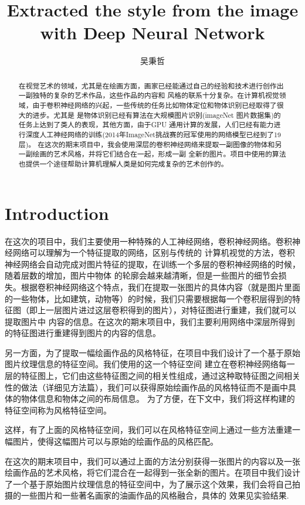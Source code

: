 \documentclass[10pt,a4paper]{ctexart}
\author{吴秉哲}
\title{Extracted the style from the image\\with Deep Neural Network}
\begin{document}
	\maketitle
	\begin{abstract}
		在视觉艺术的领域，尤其是在绘画方面，画家已经能通过自己的经验和技术进行创作出一副独特的复杂的艺术作品，这些作品的内容和
        风格的联系十分复杂。在计算机视觉领域，由于卷积神经网络的兴起，一些传统的任务比如物体定位和物体识别已经取得了很大的进步。尤其是
        是物体识别已经有算法在大规模图片识别(imageNet 图片数据集)的任务上达到了类人的表现\cite{Krizhevsky2012ImageNet}，其他方面，由于GPU
        通用计算\cite{Deng2012Large}的发展，人们已经有能力进行深度人工神经网络的训练(2014年ImageNet挑战赛的冠军使用的网络模型已经到了19层)。
        在这次的期末项目中，我会使用深层的卷积神经网络来提取一副图像的物体和另一副绘画的艺术风格，并将它们结合在一起，形成一副
        全新的图片。项目中使用的算法也提供一个途径帮助计算机理解人类是如何完成复杂的艺术创作的。
	\end{abstract}
	\section{Introduction}
	在这次的项目中，我们主要使用一种特殊的人工神经网络，卷积神经网络。卷积神经网络可以理解为一个特征提取的网络，区别与传统的
    计算机视觉的方法，卷积神经网络会自动完成对图片特征的提取，在训练一个多层的卷积神经网络的时候，随着层数的增加，图片中物体
    的轮廓会越来越清晰，但是一些图片的细节会损失。根据卷积神经网络这个特点，我们在提取一张图片的具体内容（就是图片里面的一些物体，比如建筑，动物等）的时候，我们只需要根据每一个卷积层得到的特征图（即上一层图片进过这层卷积得到的图片），对特征图进行重建，我们就可以提取图片中
    内容的信息。在这次的期末项目中，我们主要利用网络中深层所得到的特征图进行重建得到图片的内容的信息。
	
    另一方面，为了提取一幅绘画作品的风格特征，在项目中我们设计了一个基于原始图片纹理信息的特征空间。我们使用的这一个特征空间
    建立在卷积神经网络每一层的特征图上，它们由这些特征图之间的相关性组成，通过这种取特征图之间相关性的做法（详细见方法篇），我们可以获得原始绘画作品的风格特征而不是画中具体的物体信息和物体之间的布局信息。
    为了方便，在下文中，我们将这样构建的特征空间称为风格特征空间。

    这样，有了上面的风格特征空间，我们可以在风格特征空间上通过一些方法重建一幅图片，使得这幅图片可以与原始的绘画作品的风格匹配。
	
	在这次的期末项目中，我们可以通过上面的方法分别获得一张图片的内容以及一张绘画作品的艺术风格，将它们混合在一起得到一张全新的图片。在项目中我们设计了一个基于原始图片纹理信息的特征空间中，为了展示这个效果，我们会将自己拍摄的一些图片和一些著名画家的油画作品的风格融合，具体的
    效果见实验结果.
\end{document}
